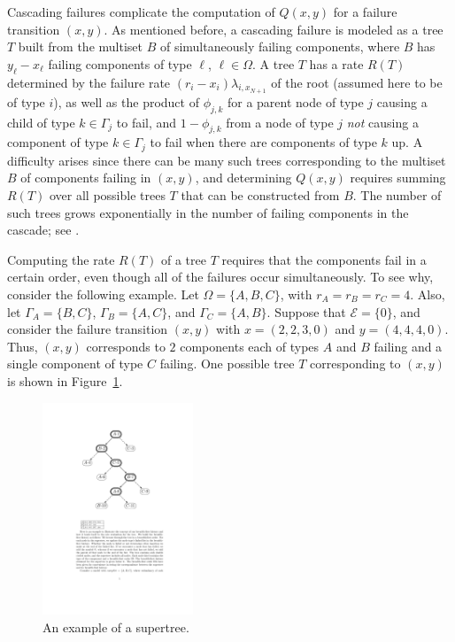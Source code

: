 \documentclass[12pt]{article}
\begin{document}
Cascading failures complicate the computation of $Q(x, y)$ for a failure transition $(x, y)$. As mentioned before, a cascading failure is modeled as a tree $T$ built from the multiset $B$ of  simultaneously failing components, where $B$ has $y_\ell - x_\ell$ failing components of type $\ell$, $\ell \in \Omega$. A tree $T$ has a rate $R(T)$ determined by the failure rate $(r_i - x_i) \lambda_{i,x_{N + 1}}$ of the root (assumed here to be of type $i$), as well as the product of $\phi_{j, k}$ for a parent node of type $j$ causing a child of type $k \in \Gamma_j$ to fail, and $1 - \phi_{j, k}$ from a node of type $j$ \textit{not} causing a component of type $k \in \Gamma_j$ to fail when there are components of type $k$ up. A difficulty arises since there can be many such trees corresponding to the multiset $B$ of components failing in $(x, y)$, and determining $Q(x, y)$ requires summing $R(T)$ over all possible trees $T$ that can be constructed from $B$. The number of such trees grows exponentially in the number of failing components in the cascade; see \cite{ING:2009}.

Computing the rate $R(T)$ of a tree $T$ requires that the components fail in a certain order, even though all of the failures occur simultaneously. To see why, consider the following example. Let $\Omega = \{ A, B, C \}$, with $r_A = r_B = r_C = 4$. Also, let $\Gamma_A = \{ B, C \}$, $\Gamma_B = \{ A, C \}$, and $\Gamma_C = \{ A, B \}$. Suppose that $\mathcal{E} = \{ 0 \}$, and consider the failure transition $(x, y)$ with $x = (2, 2, 3, 0)$ and $y = (4, 4, 4, 0)$. Thus, $(x, y)$ corresponds to $2$ components each of types $A$ and $B$ failing and a single component of type $C$ failing. One possible tree $T$ corresponding to $(x, y)$ is shown in Figure~\ref{fig:tree}.

\begin{figure}
\begin{center}
\includegraphics[width=0.4\textwidth]{fig_tree}
\end{center}
\caption{An example of a supertree.}
\label{fig:tree}
\end{figure}
\end{document}
